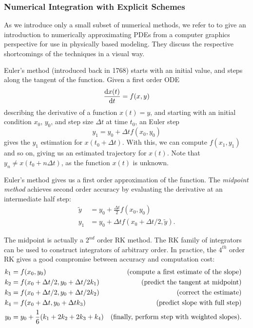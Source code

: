 \subsubsection*{Numerical Integration with Explicit Schemes}
As we introduce only a small subset of numerical methods, we refer to
\cite{Baraff1997PhysicallyBM} to give an introduction to numerically
approximating \acfp{PDE} from a computer graphics perspective for use in
physically based modeling. They discuss the respective shortcomings of the
techniques in a visual way.

Euler's method (introduced back in 1768) starts with an initial value, and steps
along the tangent of the function. Given a first order \acf{ODE} 
$$\dv{x(t)}{t} = f(x,y)$$ describing the derivative of a function $x(t) = y$,
and starting with an initial condition $x_0$, $y_0$, and step size
$\Delta t$ at time $t_0$,
an Euler step 
$$y_1 = y_0 + \Delta t f(x_0, y_0)$$
gives the $y_1$ estimation for $x(t_0 + \Delta t)$. With this, we can compute
$f(x_1, y_1)$ and so on, giving us an estimated trajectory for $x(t)$. Note that
$y_n \neq x(t_0 + n \Delta t)$, as the function $x(t)$ is unknown. 

Euler's method gives us a first order approximation of the function. The
\textit{midpoint method} achieves second order accuracy by evaluating the
derivative at an intermediate half step:
\begin{align*}\label{eq:midpoint}
  \tilde{y} &= y_0 + \frac{\Delta t}{2} f(x_0, y_0) \\
  y_1 &= y_0 + \Delta t f(x_0+ \Delta t /2, \tilde{y}).
\end{align*}

The midpoint is actually a $2^{nd}$ order \acf{RK} method. The \ac{RK}
family of integrators can be used to construct integrators of arbitrary order.
In practice, the $4^{th}$ order \ac{RK} gives a good compromise between accuracy
and computation cost:
\begin{align*}
  k_1 &= f(x_0, y_0) 
      &\qq*{(compute a first estimate of the slope)}\\
  k_2 &= f(x_0+\Delta t/2, y_0+\Delta t / 2 k_1) 
      &\qq*{(predict the tangent at midpoint)}\\
  k_3 &= f(x_0+\Delta t/2, y_0+\Delta t / 2 k_2) 
      &\qq*{(correct the estimate)}\\
  k_4 &= f(x_0+\Delta t, y_0+\Delta t k_3) 
      &\qq*{(predict slope with full step)}\\
  y_0 &= y_0 + \frac{1}{6}(k_1 + 2k_2 + 2k_3 + k_4) 
      &\qq*{(finally, perform step with weighted slopes).}
\end{align*}

